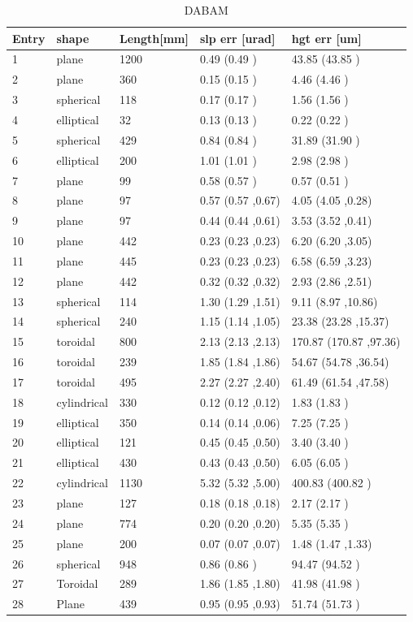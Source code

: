 \documentclass[../main.tex]{subfiles}
\begin{document}
	\begin{table}[h!]
	\centering
	\caption{DABAM}
	\label{my-label}
	\begin{tabular}{lllll}
	\textbf{Entry} & \textbf{shape} & \textbf{Length[mm]} & \textbf{slp err [urad]} & \textbf{hgt err [um]}\\
	\hline
	1 & plane & 1200 & 0.49  (0.49 ) & 43.85  (43.85 ) \\
	2 & plane & 360 & 0.15  (0.15 ) & 4.46  (4.46 ) \\
	3 & spherical & 118 & 0.17  (0.17 ) & 1.56  (1.56 ) \\
	4 & elliptical & 32 & 0.13  (0.13 ) & 0.22  (0.22 ) \\
	5 & spherical & 429 & 0.84  (0.84 ) & 31.89  (31.90 ) \\
	6 & elliptical & 200 & 1.01  (1.01 ) & 2.98  (2.98 ) \\
	7 & plane & 99 & 0.58  (0.57 ) & 0.57  (0.51 ) \\
	8 & plane & 97 & 0.57  (0.57 ,0.67) & 4.05  (4.05 ,0.28) \\
	9 & plane & 97 & 0.44  (0.44 ,0.61) & 3.53  (3.52 ,0.41) \\
	10 & plane & 442 & 0.23  (0.23 ,0.23) & 6.20  (6.20 ,3.05) \\
	11 & plane & 445 & 0.23  (0.23 ,0.23) & 6.58  (6.59 ,3.23) \\
	12 & plane & 442 & 0.32  (0.32 ,0.32) & 2.93  (2.86 ,2.51) \\
	13 & spherical & 114 & 1.30  (1.29 ,1.51) & 9.11  (8.97 ,10.86) \\
	14 & spherical & 240 & 1.15  (1.14 ,1.05) & 23.38  (23.28 ,15.37) \\
	15 & toroidal & 800 & 2.13  (2.13 ,2.13) & 170.87  (170.87 ,97.36) \\
	16 & toroidal & 239 & 1.85  (1.84 ,1.86) & 54.67  (54.78 ,36.54) \\
	17 & toroidal & 495 & 2.27  (2.27 ,2.40) & 61.49  (61.54 ,47.58) \\
	18 & cylindrical & 330 & 0.12  (0.12 ,0.12) & 1.83  (1.83 ) \\
	19 & elliptical & 350 & 0.14  (0.14 ,0.06) & 7.25  (7.25 ) \\
	20 & elliptical & 121 & 0.45  (0.45 ,0.50) & 3.40  (3.40 ) \\
	21 & elliptical & 430 & 0.43  (0.43 ,0.50) & 6.05  (6.05 ) \\
	22 & cylindrical & 1130 & 5.32  (5.32 ,5.00) & 400.83  (400.82 ) \\
	23 & plane & 127 & 0.18  (0.18 ,0.18) & 2.17  (2.17 ) \\
	24 & plane & 774 & 0.20  (0.20 ,0.20) & 5.35  (5.35 ) \\
	25 & plane & 200 & 0.07  (0.07 ,0.07) & 1.48  (1.47 ,1.33) \\
	26 & spherical & 948 & 0.86  (0.86 ) & 94.47  (94.52 ) \\
	27 & Toroidal & 289 & 1.86  (1.85 ,1.80) & 41.98  (41.98 ) \\
	28 & Plane & 439 & 0.95  (0.95 ,0.93) & 51.74  (51.73 ) \\
	\end{tabular}
	\end{table}
\end{document}
